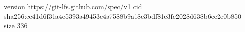 version https://git-lfs.github.com/spec/v1
oid sha256:ee41d6f31a4e5393a49453e4a7588b9a18c3bdf81e3fc2028d638b6ee2e0b850
size 336

